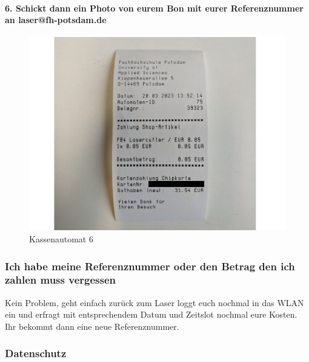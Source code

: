 \documentclass[]{article}
\let\oldparagraph\paragraph
\renewcommand{\paragraph}[1]{\oldparagraph{#1}\mbox{}}
\begin{document}
\hypertarget{schickt-dann-ein-photo-von-eurem-bon-mit-eurer-referenznummer-an-laserfh-potsdam.de}{%
\paragraph{6. Schickt dann ein Photo von eurem Bon mit eurer
Referenznummer an
laser@fh-potsdam.de}\label{schickt-dann-ein-photo-von-eurem-bon-mit-eurer-referenznummer-an-laserfh-potsdam.de}}

\begin{figure}
\hypertarget{fig:payment-6}{%
\centering
\includegraphics{assets/images/payment-6.png}
\caption{Kassenautomat 6}\label{fig:payment-6}
}
\end{figure}

\hypertarget{ich-habe-meine-referenznummer-oder-den-betrag-den-ich-zahlen-muss-vergessen}{%
\subsubsection{Ich habe meine Referenznummer oder den Betrag den ich
zahlen muss
vergessen}\label{ich-habe-meine-referenznummer-oder-den-betrag-den-ich-zahlen-muss-vergessen}}

Kein Problem, geht einfach zurück zum Laser loggt euch nochmal in das
WLAN ein und erfragt mit entsprechendem Datum und Zeitslot nochmal eure
Kosten. Ihr bekommt dann eine neue Referenznummer.

\hypertarget{datenschutz}{%
\subsubsection{Datenschutz}\label{datenschutz}}
\end{document}
